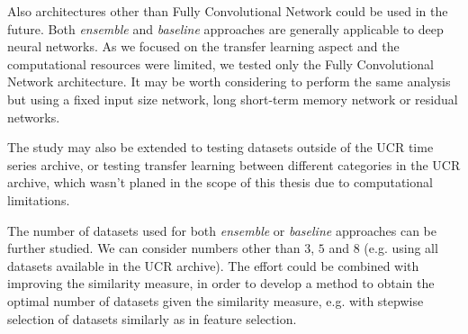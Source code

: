 \documentclass[a4paper,11pt,twoside]{report}
\theoremstyle{definition}
\begin{document}
Also architectures other than Fully Convolutional Network could be used in the future. Both\textit{ ensemble }and\textit{ baseline} approaches are generally applicable to deep neural networks. As we focused on the transfer learning aspect and the computational resources were limited, we tested only the Fully Convolutional Network architecture. It may be worth considering to perform the same analysis but using a fixed input size network, long short-term memory network or residual networks.

The study may also be extended to testing datasets outside of the UCR time series archive,  or testing transfer learning between different categories in the UCR archive, which wasn't planed in the scope of this thesis due to computational limitations.

The number of datasets used for both \textit{ensemble} or \textit{baseline} approaches can be further studied. We can consider numbers other than $3$, $5$ and $8$ (e.g. using all datasets available in the UCR archive). The effort could be combined with improving the similarity measure, in order to develop a method to obtain the optimal number of datasets given the similarity measure, e.g. with stepwise selection of datasets similarly as in feature selection.




\


\thispagestyle{empty}
\end{document}
